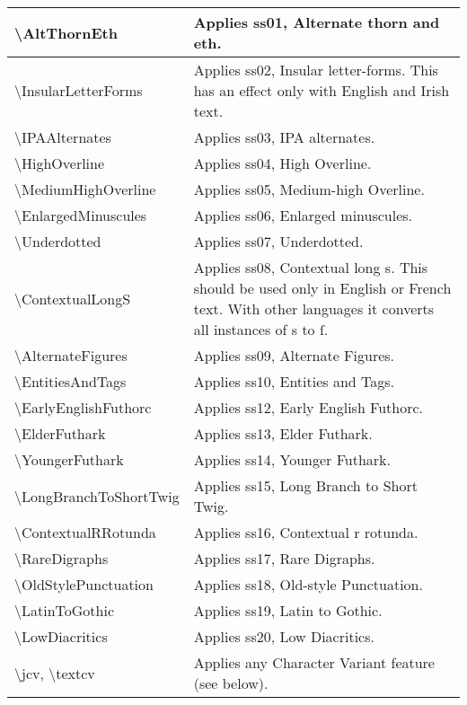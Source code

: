 \documentclass{article}
\begin{document}
\begin{center}
\tablehead{\hline}
\tabletail{\hline}
\begin{supertabular}{| l | p{2.75in} |}
\textbackslash AltThornEth & Applies ss01, Alternate thorn and eth.\\\hline
\textbackslash InsularLetterForms & Applies ss02, Insular letter-forms.
This has an effect only with English and Irish text.\\\hline
\textbackslash IPAAlternates & Applies ss03, IPA alternates.\\\hline
\textbackslash HighOverline & Applies ss04, High Overline.\\\hline
\textbackslash MediumHighOverline & Applies ss05, Medium-high Overline.\\\hline
\textbackslash EnlargedMinuscules & Applies ss06, Enlarged minuscules.\\\hline
\textbackslash Underdotted & Applies ss07, Underdotted.\\\hline
\textbackslash ContextualLongS & Applies ss08, Contextual long s. This should be used only in English or
French text. With other languages it converts all instances of s to ſ.\\\hline
\textbackslash AlternateFigures & Applies ss09, Alternate Figures.\\\hline
\textbackslash EntitiesAndTags & Applies ss10, Entities and Tags.\\\hline
\textbackslash EarlyEnglishFuthorc & Applies ss12, Early English Futhorc.\\\hline
\textbackslash ElderFuthark & Applies ss13, Elder Futhark.\\\hline
\textbackslash YoungerFuthark & Applies ss14, Younger Futhark.\\\hline
\textbackslash LongBranchToShortTwig & Applies ss15, Long Branch to Short Twig.\\\hline
\textbackslash ContextualRRotunda & Applies ss16, Contextual r rotunda.\\\hline
\textbackslash RareDigraphs & Applies ss17, Rare Digraphs.\\\hline
\textbackslash OldStylePunctuation & Applies ss18, Old-style Punctuation.\\\hline
\textbackslash LatinToGothic & Applies ss19, Latin to Gothic.\\\hline
\textbackslash LowDiacritics & Applies ss20, Low Diacritics.\\\hline
\textbackslash jcv, \textbackslash textcv & Applies any Character Variant feature (see below).\\
\end{supertabular}
\end{center}
\end{document}
